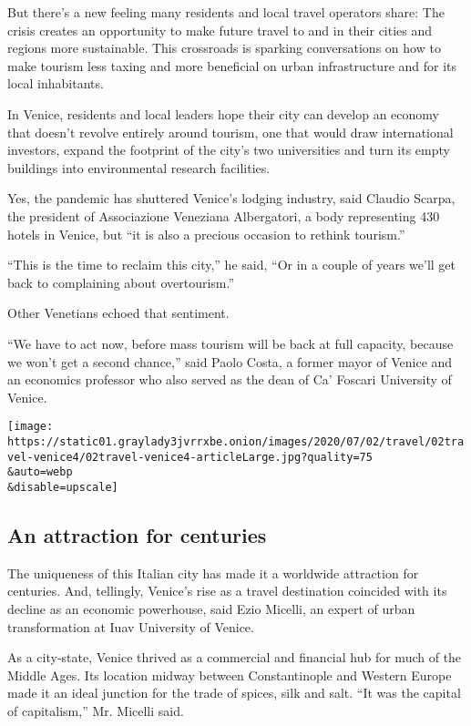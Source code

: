 But there's a new feeling many residents and local travel operators
share: The crisis creates an opportunity to make future travel to and in
their cities and regions more sustainable. This crossroads is sparking
conversations on how to make tourism less taxing and more beneficial on
urban infrastructure and for its local inhabitants.

In Venice, residents and local leaders hope their city can develop an
economy that doesn't revolve entirely around tourism, one that would
draw international investors, expand the footprint of the city's two
universities and turn its empty buildings into environmental research
facilities.

Yes, the pandemic has shuttered Venice's lodging industry, said Claudio
Scarpa, the president of Associazione Veneziana Albergatori, a body
representing 430 hotels in Venice, but ``it is also a precious occasion
to rethink tourism.''

``This is the time to reclaim this city,'' he said, ``Or in a couple of
years we'll get back to complaining about overtourism.''

Other Venetians echoed that sentiment.

``We have to act now, before mass tourism will be back at full capacity,
because we won't get a second chance,'' said Paolo Costa, a former mayor
of Venice and an economics professor who also served as the dean of Ca'
Foscari University of Venice.

\texttt{[image: https://static01.graylady3jvrrxbe.onion/images/2020/07/02/travel/02travel-venice4/02travel-venice4-articleLarge.jpg?quality=75\\\&auto=webp\\\&disable=upscale]}

\hypertarget{an-attraction-for-centuries}{%
\subsection{An attraction for
centuries}\label{an-attraction-for-centuries}}

The uniqueness of this Italian city has made it a worldwide attraction
for centuries. And, tellingly, Venice's rise as a travel destination
coincided with its decline as an economic powerhouse, said Ezio Micelli,
an expert of urban transformation at Iuav University of Venice.

As a city-state, Venice thrived as a commercial and financial hub for
much of the Middle Ages. Its location midway between Constantinople and
Western Europe made it an ideal junction for the trade of spices, silk
and salt. ``It was the capital of capitalism,'' Mr. Micelli said.

